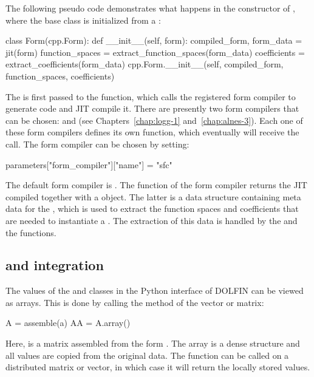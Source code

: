 The following pseudo code demonstrates what happens in the constructor
of , where the base class  is initialized
from a :
\begin{python}
class Form(cpp.Form):
    def __init__(self, form):
        compiled_form, form_data = jit(form)
        function_spaces = extract_function_spaces(form_data)
        coefficients = extract_coefficients(form_data)
        cpp.Form.__init__(self, compiled_form, function_spaces, coefficients)
\end{python}
The  is first passed to the  function,
which calls the registered form compiler to generate code and JIT
compile it. There are presently two form compilers that can be
chosen:  and  (see Chapters~\ref{chap:logg-1}
and~\ref{chap:alnes-3}). Each one of these form compilers defines its
own  function, which eventually will receive the call. The form
compiler can be chosen by setting:
\begin{python}
parameters["form_compiler"]["name"] = "sfc"
\end{python}
The default form compiler is . The  function
of the form compiler returns the JIT compiled 
together with a  object. The latter is a data
structure containing meta data for the , which is used
to extract the function spaces and coefficients that are needed to
instantiate a . The extraction of this data is handled by
the  and the 
functions.

\subsection{\numpy and \scipy integration}

The values of the  and  classes in the Python
interface of DOLFIN can be viewed as \numpy arrays. This is done by
calling the  method of the vector or matrix:
\begin{python}
A  = assemble(a)
AA = A.array()
\end{python}
Here,  is a matrix assembled from the form . The \numpy
array  is a dense structure and all values are copied from the
original data. The  function can be called on a distributed
matrix or vector, in which case it will return the locally stored
values.

